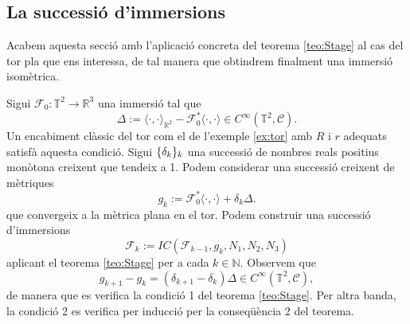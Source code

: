 \subsection{La successió d'immersions}
Acabem aquesta secció amb l'aplicació concreta del teorema \ref{teo:Stage} al cas del tor pla que ens interessa, de tal manera que obtindrem finalment una immersió isomètrica.

Sigui $\mathcal F_0:\mathbb T^2\to\mathbb R^3$ una immersió tal que
\begin{equation*}
    \Delta := \langle\cdot, \cdot\rangle_{\mathbb R^2} - \mathcal F_0^*\langle\cdot, \cdot\rangle\in C^\infty(\mathbb T^2, \mathcal C).
\end{equation*}
Un encabiment clàssic del tor com el de l'exemple \ref{ex:tor} amb $R$ i $r$ adequats satisfà aquesta condició. Sigui $\{\delta_k\}_k$ una successió de nombres reals positius monòtona creixent que tendeix a 1. Podem considerar una successió creixent de mètriques
\begin{equation*}
    g_k := \mathcal F_0^*\langle\cdot, \cdot\rangle + \delta_k\Delta.
\end{equation*}
que convergeix a la mètrica plana en el tor. Podem construir una successió d'immersions
\begin{equation*}
    \mathcal F_k := IC(\mathcal F_{k-1}, g_k, N_1, N_2, N_3)
\end{equation*}
aplicant el teorema \ref{teo:Stage} per a cada $k\in\mathbb N$. Observem que
\begin{equation*}
    g_{k+1} - g_k = (\delta_{k+1}-\delta_k)\Delta\in C^\infty(\mathbb T^2, \mathcal C),
\end{equation*}
de manera que es verifica la condició 1 del teorema \ref{teo:Stage}. Per altra banda, la condició 2 es verifica per inducció per la conseqüència 2 del teorema.

